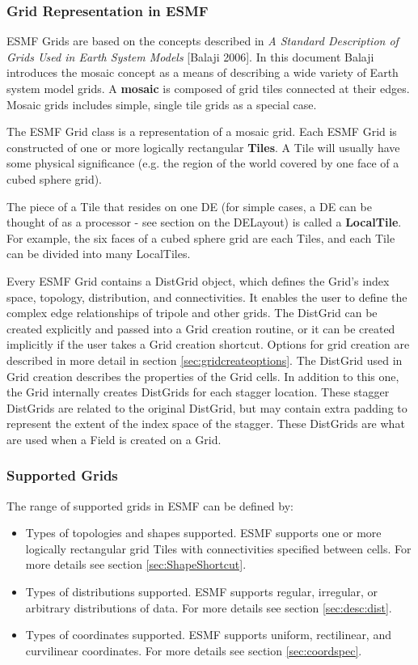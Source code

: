 \subsubsection{Grid Representation in ESMF}

ESMF Grids are based on the concepts described in {\it A Standard
Description of Grids Used in Earth System Models} [Balaji 2006].  In this document
Balaji introduces the mosaic concept as a means of describing
a wide variety of Earth system model grids.  A {\bf mosaic} is
composed of grid tiles connected at their edges.  Mosaic grids
includes simple, single tile grids as a special case.  

The ESMF Grid class is a representation of a mosaic grid.  Each ESMF
Grid is constructed of one or more logically rectangular {\bf Tiles}.
A Tile will usually have some physical significance (e.g. the region
of the world covered by one face of a cubed sphere grid).

The piece of a Tile that resides on one DE (for simple cases, a DE
can be thought of as a processor - see section on the DELayout)
is called a {\bf LocalTile}.  For example, the six faces of a cubed
sphere grid are each Tiles, and each Tile can be divided into many
LocalTiles.  

Every ESMF Grid contains a DistGrid object, which defines the Grid's
index space, topology, distribution, and connectivities.  It enables
the user to define the complex edge relationships of tripole and other
grids.  The DistGrid can be created explicitly and passed into a Grid
creation routine, or it can be created implicitly if the user takes
a Grid creation shortcut.  Options for grid creation are described in 
more detail in section \ref{sec:gridcreateoptions}. The DistGrid used
in Grid creation describes the properties of the Grid cells. In addition
to this one, the Grid internally creates DistGrids for each stagger location. 
These stagger DistGrids are related to the original DistGrid, but may 
contain extra padding to represent the extent of the index space of
the stagger. These DistGrids are what are used when a Field is created 
on a Grid. 

\subsubsection{Supported Grids}

The range of supported grids in ESMF can be defined by:
\begin{itemize}
\item Types of topologies and shapes supported.  ESMF supports one or
more logically rectangular grid Tiles with connectivities specified
between cells.  For more details see section \ref{sec:ShapeShortcut}.
\item Types of distributions supported.  ESMF supports  regular,
irregular, or arbitrary distributions of data.  
For more details see section \ref{sec:desc:dist}.
\item Types of coordinates supported.  ESMF supports uniform, rectilinear,
and curvilinear coordinates.  For more details see section \ref{sec:coordspec}.
\end{itemize}

